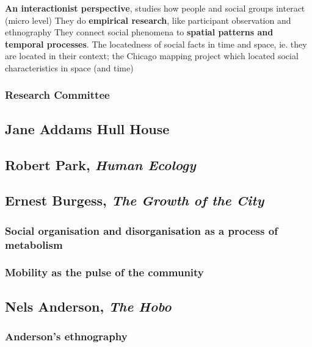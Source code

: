 \documentclass{article}
\begin{document}
\begin{outline}
	\1 \textbf{An interactionist perspective}, studies how people and social groups interact (micro level)
	\1 They do \textbf{empirical research}, like participant observation and ethnography
	\1 They connect social phenomena to \textbf{spatial patterns and temporal processes}. The locatedness of social facts in time and space, ie. they are located in their context; the Chicago mapping project which located social characteristics in space (and time)
\end{outline}

\subsubsection{Research Committee}

\subsection{Jane Addams Hull House}

\subsection{Robert Park, \textit{Human Ecology}}

\subsection{Ernest Burgess, \textit{The Growth of the City}}

\subsubsection{Social organisation and disorganisation as a process of metabolism}

\subsubsection{Mobility as the pulse of the community}

\subsection{Nels Anderson, \textit{The Hobo}}

\subsubsection{Anderson's ethnography}
\end{document}
